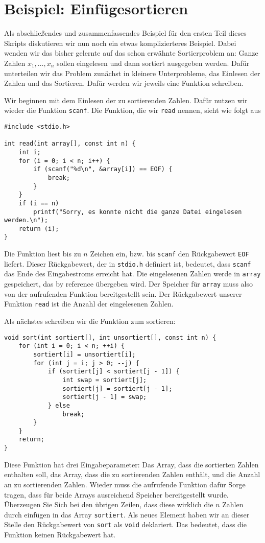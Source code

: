 \section{Beispiel: Einfügesortieren}

Als abschließendes und zusammenfassendes Beispiel für den ersten Teil dieses Skripts diskutieren wir nun noch ein etwas komplizierteres Beispiel.
Dabei wenden wir das bisher gelernte auf das schon erwähnte Sortierproblem an:
Ganze Zahlen $x_1, \ldots, x_n$ sollen eingelesen und dann sortiert ausgegeben werden.
Dafür unterteilen wir das Problem zunächst in kleinere Unterprobleme, das Einlesen der Zahlen und das Sortieren.
Dafür werden wir jeweils eine Funktion schreiben.

Wir beginnen mit dem Einlesen der zu sortierenden Zahlen.
Dafür nutzen wir wieder die Funktion \verb|scanf|.
Die Funktion, die wir \verb|read| nennen, sieht wie folgt aus
\begin{lstlisting}
#include <stdio.h>

int read(int array[], const int n) {
    int i;
    for (i = 0; i < n; i++) {
        if (scanf("%d\n", &array[i]) == EOF) {
            break;
        }
    }
    if (i == n)
        printf("Sorry, es konnte nicht die ganze Datei eingelesen werden.\n");
    return (i);
}
\end{lstlisting}
Die Funktion liest bis zu $n$ Zeichen ein, bzw. bis \verb|scanf| den Rückgabewert \verb|EOF| liefert.
Dieser Rückgabewert, der in \verb|stdio.h| definiert ist, bedeutet, dass \verb|scanf| das Ende des Eingabestroms erreicht hat.
Die eingelesenen Zahlen werde in \verb|array| gespeichert, das by reference übergeben wird.
Der Speicher für \verb|array| muss also von der aufrufenden Funktion bereitgestellt sein.
Der Rückgabewert unserer Funktion \verb|read| ist die Anzahl der eingelesenen Zahlen.

Als nächstes schreiben wir die Funktion zum sortieren:
\begin{lstlisting}
void sort(int sortiert[], int unsortiert[], const int n) {
    for (int i = 0; i < n; ++i) {
        sortiert[i] = unsortiert[i];
        for (int j = i; j > 0; --j) {
            if (sortiert[j] < sortiert[j - 1]) {
                int swap = sortiert[j];
                sortiert[j] = sortiert[j - 1];
                sortiert[j - 1] = swap;
            } else
                break;
        }
    }
    return;
}
\end{lstlisting}
Diese Funktion hat drei Eingabeparameter: Das Array, dass die sortierten Zahlen enthalten soll, das Array, dass die zu sortierenden Zahlen enthält, und die Anzahl an zu sortierenden Zahlen.
Wieder muss die aufrufende Funktion dafür Sorge tragen, dass für beide Arrays ausreichend Speicher bereitgestellt wurde.
Überzeugen Sie Sich bei den übrigen Zeilen, dass diese wirklich die $n$ Zahlen durch einfügen in das Array \verb|sortiert|.
Als neues Element haben wir an dieser Stelle den Rückgabewert von \verb|sort| als \verb|void| deklariert. 
Das bedeutet, dass die Funktion keinen Rückgabewert hat.

